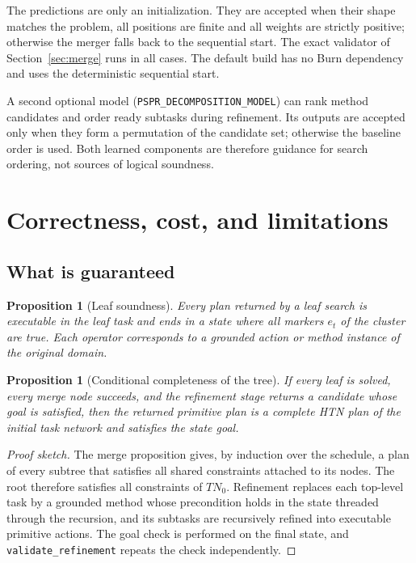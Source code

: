 \documentclass[11pt,a4paper]{article}
\newtheorem{proposition}[definition]{Proposition}
\begin{document}
The predictions are only an initialization. They are accepted when their
shape matches the problem, all positions are finite and all weights are
strictly positive; otherwise the merger falls back to the sequential start.
The exact validator of Section~\ref{sec:merge} runs in all cases. The default
build has no Burn dependency and uses the deterministic sequential start.

A second optional model (\texttt{PSPR\_DECOMPOSITION\_MODEL}) can rank method
candidates and order ready subtasks during refinement. Its outputs are
accepted only when they form a permutation of the candidate set; otherwise the
baseline order is used. Both learned components are therefore guidance for
search ordering, not sources of logical soundness.

\section{Correctness, cost, and limitations}
\label{sec:analysis}

\subsection{What is guaranteed}
\begin{proposition}[Leaf soundness]
Every plan returned by a leaf search is executable in the leaf task and ends
in a state where all markers $e_t$ of the cluster are true. Each operator
corresponds to a grounded action or method instance of the original domain.
\end{proposition}

\begin{proposition}[Conditional completeness of the tree]
If every leaf is solved, every merge node succeeds, and the refinement stage
returns a candidate whose goal is satisfied, then the returned primitive plan
is a complete HTN plan of the initial task network and satisfies the state
goal.
\end{proposition}
\begin{proof}[Proof sketch]
The merge proposition gives, by induction over the schedule, a plan of every
subtree that satisfies all shared constraints attached to its nodes. The root
therefore satisfies all constraints of $TN_0$. Refinement replaces each
top-level task by a grounded method whose precondition holds in the state
threaded through the recursion, and its subtasks are recursively refined into
executable primitive actions. The goal check is performed on the final state,
and \texttt{validate\_refinement} repeats the check independently.
\end{proof}
\end{document}
